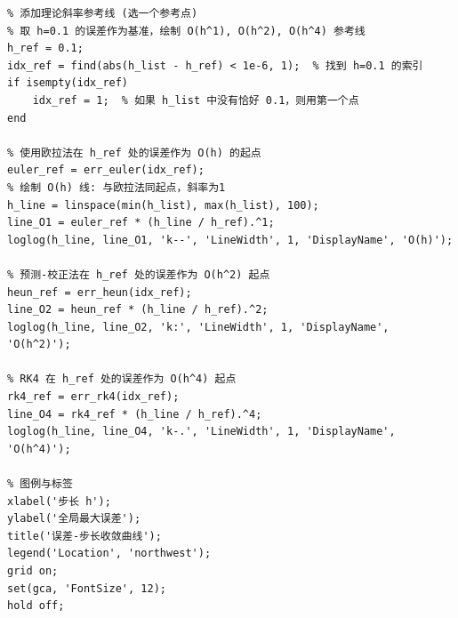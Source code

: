 \documentclass[12pt,a4paper]{ctexart}
\begin{document}
\begin{lstlisting}
% 添加理论斜率参考线 (选一个参考点)
% 取 h=0.1 的误差作为基准，绘制 O(h^1), O(h^2), O(h^4) 参考线
h_ref = 0.1;
idx_ref = find(abs(h_list - h_ref) < 1e-6, 1);  % 找到 h=0.1 的索引
if isempty(idx_ref)
    idx_ref = 1;  % 如果 h_list 中没有恰好 0.1，则用第一个点
end

% 使用欧拉法在 h_ref 处的误差作为 O(h) 的起点
euler_ref = err_euler(idx_ref);
% 绘制 O(h) 线: 与欧拉法同起点，斜率为1
h_line = linspace(min(h_list), max(h_list), 100);
line_O1 = euler_ref * (h_line / h_ref).^1;
loglog(h_line, line_O1, 'k--', 'LineWidth', 1, 'DisplayName', 'O(h)');

% 预测-校正法在 h_ref 处的误差作为 O(h^2) 起点
heun_ref = err_heun(idx_ref);
line_O2 = heun_ref * (h_line / h_ref).^2;
loglog(h_line, line_O2, 'k:', 'LineWidth', 1, 'DisplayName', 'O(h^2)');

% RK4 在 h_ref 处的误差作为 O(h^4) 起点
rk4_ref = err_rk4(idx_ref);
line_O4 = rk4_ref * (h_line / h_ref).^4;
loglog(h_line, line_O4, 'k-.', 'LineWidth', 1, 'DisplayName', 'O(h^4)');

% 图例与标签
xlabel('步长 h');
ylabel('全局最大误差');
title('误差-步长收敛曲线');
legend('Location', 'northwest');
grid on;
set(gca, 'FontSize', 12);
hold off;
\end{lstlisting}
\end{document}
